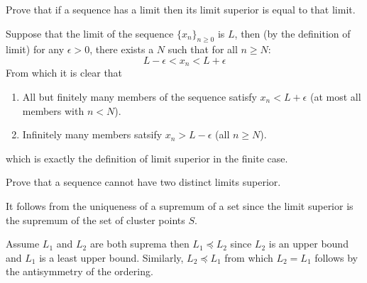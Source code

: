 \begin{exercise} \label{ex:2-9}
    Prove that if a sequence has a limit then its limit superior is equal to that limit.
\end{exercise}
\begin{solution}
    Suppose that the limit of the sequence $\{x_n\}_{n\geq0}$ is $L$, then (by the definition of limit) for any $\epsilon > 0$, there exists a $N$ such that for all $n \geq N$:
    \[
        L - \epsilon < x_n < L + \epsilon
    \]
    From which it is clear that
    \begin{enumerate}[label=\roman*]
        \item All but finitely many members of the sequence satisfy $x_n < L + \epsilon$ (at most all members with $n < N$).
        \item Infinitely many members satsify $x_n > L - \epsilon$ (all $n \geq N$).
    \end{enumerate}
    which is exactly the definition of limit superior in the finite case.
\end{solution}

\begin{exercise}
    Prove that a sequence cannot have two distinct limits superior.
\end{exercise}
\begin{solution}
    It follows from the uniqueness of a supremum of a set since the limit superior is the supremum of the set of cluster points $S$.

    Assume $L_1$ and $L_2$ are both suprema then $L_1 \preccurlyeq L_2$ since $L_2$ is an upper bound and $L_1$ is a least upper bound. Similarly, $L_2 \preccurlyeq L_1$ from which $L_2 = L_1$ follows by the antisymmetry of the ordering.
\end{solution}

